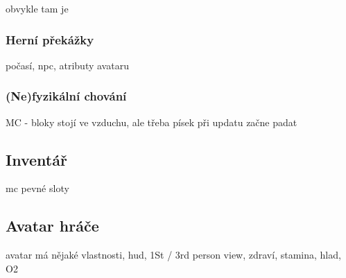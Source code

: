 obvykle tam je

\subsubsection{Herní překážky}

počasí, \gls{npc}, atributy avataru

\subsubsection{(Ne)fyzikální chování}

MC - bloky stojí ve vzduchu, ale třeba písek při updatu začne padat

\subsection{Inventář}

mc pevné sloty

\subsection{Avatar hráče}
avatar má nějaké vlastnosti, \gls{hud}, 1St / 3rd person view, zdraví, stamina, hlad, O2



